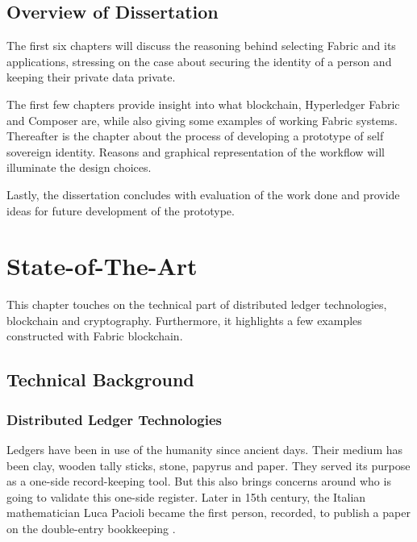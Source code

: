 \documentclass[a4paper,11pt]{report}
\begin{document}
\section{Overview of Dissertation}

The first six chapters will discuss the reasoning behind selecting Fabric and its applications, stressing on the case about securing the identity of a person and keeping their private data private. 

The first few chapters provide insight into what blockchain, Hyperledger Fabric and Composer are, while also giving some examples of working Fabric systems. Thereafter is the chapter about the process of developing a prototype of self sovereign identity. Reasons and graphical representation of the workflow will illuminate the design choices. 

Lastly, the dissertation concludes with evaluation of the work done and provide ideas for future development of the prototype.   
  



\chapter{State-of-The-Art}
\label{state}

This chapter touches on the technical part of distributed ledger technologies, blockchain and cryptography. Furthermore, it highlights a few examples constructed with Fabric blockchain. 
 
\section{Technical Background}
\subsection{Distributed Ledger Technologies}

\label{dlt}

Ledgers have been in use of the humanity since ancient days. Their medium has been clay, wooden tally sticks, stone, papyrus and paper. They served its purpose as a one-side record-keeping tool. But this also brings concerns around who is going to validate this one-side register. Later in 15th century, the Italian mathematician Luca Pacioli became the first person, recorded, to publish a paper on the double-entry bookkeeping \cite{ledgers}.
\end{document}
